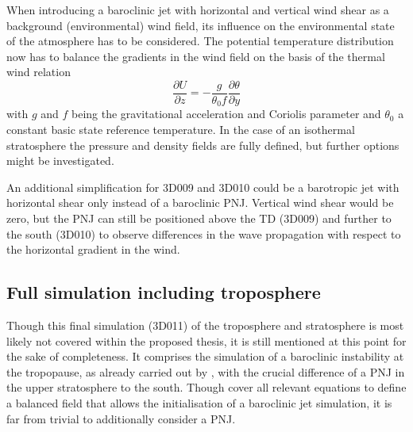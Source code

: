 When introducing a baroclinic jet with horizontal and vertical wind shear as a background (environmental) wind field, its influence on the environmental state of the atmosphere has to be considered. The potential temperature distribution now has to balance the gradients in the wind field on the basis of the thermal wind relation
%
\begin{equation}
    \frac{\partial U}{\partial z} = -\frac{g}{\theta_0 f} \frac{\partial \theta}{\partial y}
    \label{equ:thermalWind}
\end{equation}
%
with $g$ and $f$ being the gravitational acceleration and Coriolis parameter and $\theta_0$ a constant basic state reference temperature. In the case of an isothermal stratosphere the pressure and density fields are fully defined, but further options might be investigated.

An additional simplification for 3D009 and 3D010 could be a barotropic jet with horizontal shear only instead of a baroclinic PNJ. Vertical wind shear would be zero, but the PNJ can still be positioned above the TD (3D009) and further to the south (3D010) to observe differences in the wave propagation with respect to the horizontal gradient in the wind.

\subsection{Full simulation including troposphere}
\label{sec:barocInstability}

Though this final simulation (3D011) of the troposphere and stratosphere is most likely not covered within the proposed thesis, it is still mentioned at this point for the sake of completeness. It comprises the simulation of a baroclinic instability at the tropopause, as already carried out by \textcite{bush_tropopause_1994}, with the crucial difference of a PNJ in the upper stratosphere to the south. Though \textcite{bush_tropopause_1994} cover all relevant equations to define a balanced field that allows the initialisation of a baroclinic jet simulation, it is far from trivial to additionally consider a PNJ. 

 





